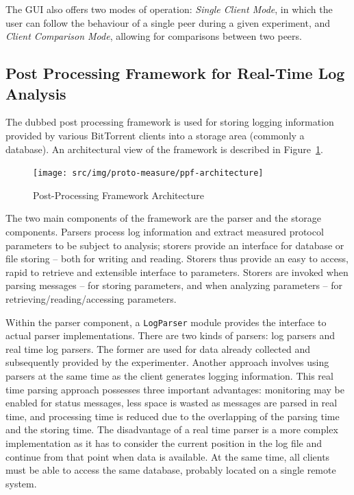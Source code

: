 The GUI also offers two modes of operation: \textit{Single Client Mode},
in which the user can follow the behaviour of a single peer during a given
experiment, and \textit{Client Comparison Mode}, allowing for comparisons
between two peers.

\subsection{Post Processing Framework for Real-Time Log Analysis}

The dubbed post processing framework is used for storing logging information
provided by various BitTorrent clients into a storage area (commonly a
database). An architectural view of the framework is described in
Figure~\ref{fig:proto-measure:ppf-architecture}.

\begin{figure}[h]
  \begin{center}
    \texttt{[image: src/img/proto-measure/ppf-architecture]}
  \end{center}
  \caption{Post-Processing Framework Architecture}
  \label{fig:proto-measure:ppf-architecture}
\end{figure}

The two main components of the framework are the parser and the storage
components. Parsers process log information and extract measured protocol
parameters to be subject to analysis; storers provide an interface for
database or file storing -- both for writing and reading. Storers thus provide
an easy to access, rapid to retrieve and extensible interface to parameters.
Storers are invoked when parsing messages -- for storing parameters, and when
analyzing parameters -- for retrieving/reading/accessing parameters.

Within the parser component, a \texttt{LogParser} module provides the
interface to actual parser implementations. There are two kinds of parsers:
log parsers and real time log parsers. The former are used for data already
collected and subsequently provided by the experimenter. Another approach
involves using parsers at the same time as the client generates logging
information. This real time parsing approach possesses three important
advantages: monitoring may be enabled for status messages, less space is
wasted as messages are parsed in real time, and processing time is reduced due
to the overlapping of the parsing time and the storing time. The disadvantage
of a real time parser is a more complex implementation as it has to consider
the current position in the log file and continue from that point when data is
available. At the same time, all clients must be able to access the same
database, probably located on a single remote system.

